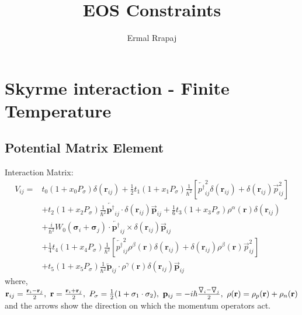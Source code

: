 \documentclass[preprint,prc,preprintnumbers,superscriptaddress,amsmath,amssymb,floatfix]{revtex4-1}
\begin{document}
\title{EOS Constraints}

\author{Ermal Rrapaj}
\begin{abstract}

\end{abstract}
\section{Skyrme interaction - Finite Temperature}
\subsection{Potential Matrix Element}
Interaction Matrix:
\begin{equation}
 \begin{split}
  V_{ij}=&t_0(1+x_0 P_{\sigma})\delta(\mathbf{r}_{ij})+\frac{1}{2}t_1(1+x_1P_{\sigma}) \frac{1}{\hbar^2}[\overleftarrow{p^{\dagger}}^2_{ij}\delta(\mathbf{r}_{ij})+\delta(\mathbf{r}_{ij})\overrightarrow{p}^2_{ij}]\\
  &+t_2(1+x_2P_{\sigma})\frac{1}{\hbar^2}\overleftarrow{\mathbf{p}^{\dagger}}_{ij}\cdot \delta(\mathbf{r}_{ij})\overrightarrow{\mathbf{p}}_{ij}+\frac{1}{6}t_3(1+x_3P_{\sigma})\rho^{\alpha}(\mathbf{r})\delta(\mathbf{r}_{ij})\\
  &+\frac{i}{\hbar^2}W_0(\mathbf{\sigma}_i+\mathbf{\sigma}_j)\cdot \overleftarrow{\mathbf{p}^{\dagger}}_{ij} \times \delta(\mathbf{r}_{ij})\overrightarrow{\mathbf{p}}_{ij}\\
  &+\frac{1}{4}t_4(1+x_4 P_{\sigma})\frac{1}{\hbar^2}[ \overleftarrow{p^{\dagger}}^2_{ij}\rho^{\beta}(\mathbf{r})\delta(\mathbf{r}_{ij})+\delta(\mathbf{r}_{ij})\rho^{\beta}(\mathbf{r})\overrightarrow{p}^2_{ij}]\\
  &+t_5(1+x_5P_{\sigma})\frac{1}{\hbar^2}\overleftarrow{\mathbf{p}}_{ij}\cdot \rho^{\gamma}(\mathbf{r})\delta(\mathbf{r}_{ij})\overrightarrow{\mathbf{p}}_{ij}
 \end{split}
\end{equation}
where, $\mathbf{r}_{ij}=\frac{\mathbf{r}_i-\mathbf{r}_j}{2},\ \mathbf{r}=\frac{\mathbf{r}_i+\mathbf{r}_j}{2},\ P_{\sigma}= \frac{1}{2}(1+\mathbf{\sigma}_1\cdot \mathbf{\sigma}_2),\ \mathbf{p}_{ij}=-i\hbar \frac{\boldmath{\bigtriangledown}_i-\mathbf{\bigtriangledown}_j}{2},\ \rho(\mathbf{r})=\rho_p(\mathbf{r})+\rho_n(\mathbf{r})$
 and the arrows show the direction on which the momentum operators act.
 
\end{document}
